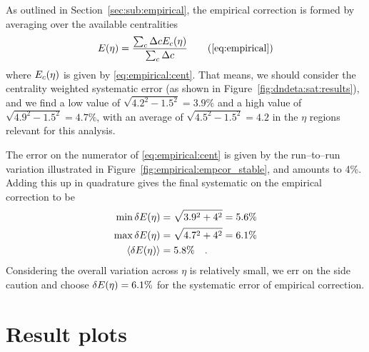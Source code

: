 \documentclass[compat,11pt]{alicenote}
\newcommand*\EmpCor[1][]{\ensuremath E\ifx|#1|\relax\else_{#1}\fi(\eta)}
\newcommand{\secref}[1]{Section~\ref{#1}}
\newcommand{\figref}[1]{Figure~\ref{#1}}
\begin{document}
As outlined in \secref{sec:sub:empirical}, the empirical correction is
formed by averaging over the available centralities 
\begin{equation}
  \EmpCor{} = \frac{\sum_c \Delta c\EmpCor[c]{}}{\sum_c \Delta c}
  \tag{\ref{eq:empirical}}
\end{equation}
where $\EmpCor[c]{}$ is given by \eqref{eq:empirical:cent}.  That
means, we should consider the centrality weighted systematic error (as
shown in \figref{fig:dndeta:sat:results}), and we find a low value of
$\sqrt{4.2^2-1.5^2}=3.9\%$ and a high value of
$\sqrt{4.9^2-1.5^2}=4.7\%$, with an average of
$\sqrt{4.5^2-1.5^2}=4.2$ in the $\eta$ regions relevant for this
analysis. 

The error on the numerator of \eqref{eq:empirical:cent} is given by
the run--to--run variation illustrated in
\figref{fig:empirical:empcor_stable}, and amounts to 4\%.  Adding this
up in quadrature gives the final systematic on the empirical
correction to be 
\begin{align}
  \label{eq:empcorr:syserr}
  \min{\delta\EmpCor{}} &= \sqrt{3.9^2+4^2} = 5.6\%\nonumber\\
  \max{\delta\EmpCor{}} &= \sqrt{4.7^2+4^2} = 6.1\%\nonumber\\
  \langle\delta\EmpCor{}\rangle &= 5.8\%\quad.\\
\end{align}
Considering the overall variation across $\eta$ is relatively small,
we err on the side caution and choose $\delta\EmpCor{}=6.1\%$ for the
systematic error of empirical correction. 


\section{Result plots} 

\subsection{\PbPbCol{}}
\end{document}
